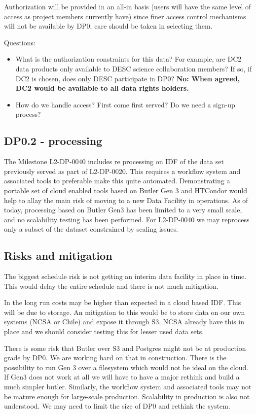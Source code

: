 Authorization will be provided in an all-in basis (users will have the same level of access as project members currently have) since finer access control mechanisms will not be available by DP0; care should be taken in selecting them.

Questions:

\begin{itemize}

\item What is the authorization constraints for this data? For example, are DC2 data products only available to DESC science collaboration members? If so, if DC2 is chosen, does only DESC participate in DP0?
	{\bf No: When agreed, DC2 would be available to all data rights holders.}

\item How do we handle access? First come first served? Do we need a sign-up process?

\end{itemize}

\subsection{DP0.2 - processing}

The Milestone L2-DP-0040 includes re processing on IDF of the data set previously served as part of L2-DP-0020.
This requires a workflow system and associated tools to preferable make this quite automated.
Demonstrating a portable set of cloud enabled tools based on Butler Gen 3 and HTCondor would help to allay the main risk of moving to a new Data Facility in operations.
As of today, processing based on Butler Gen3 has been limited to a very small scale, and no scalability testing has been performed. For L2-DP-0040 we may reprocess only a subset of the dataset constrained by scaling issues.


\subsection{Risks and mitigation}

The biggest schedule risk is not getting an interim data facility in place in time.
This would delay the entire schedule and there is not much mitigation.

In the long run costs may be higher than expected in a cloud based IDF. This will be due to storage.
An mitigation to this would be to store data on our own systems (NCSA or Chile) and expose it through S3.
NCSA already have this in place and we should consider testing this for lesser used data sets.

There is some risk that  Butler over S3 and Postgres  might not be at  production grade by DP0. We are working hard on that in construction. There is the possibility to run Gen 3 over a filesystem which would not be ideal on the cloud. If Gen3 does not work at all we will have to have a major rethink and build a much simpler butler.
Similarly, the workflow system and associated tools may not be mature enough for large-scale production. Scalability in production is also not understood. We may need to limit the size of DP0 and rethink the system.
